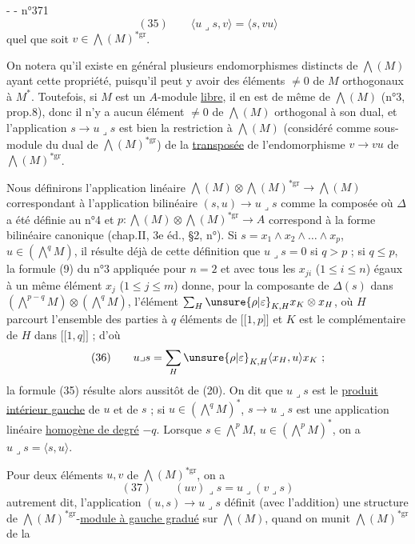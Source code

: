 -  -
\hfill n°371
\[
(35)\qquad\langle u\lrcorner s,v\rangle=\langle s,vu\rangle
\]
quel que soit $v\in\bigwedge(M)^{*\mathrm{gr}}$.

On notera qu'il existe en général plusieurs endomorphismes distincts de $\bigwedge(M)$ ayant cette propriété, puisqu'il peut y avoir des éléments $\ne0$ de $M$ orthogonaux à $M^*$. Toutefois, si $M$ est un $A$-module \uline{libre}, il en est de même de $\bigwedge(M)$ (n°3, prop.8), donc il n'y a aucun élément $\ne0$ de $\bigwedge(M)$ orthogonal à son dual, et l'application $s\longrightarrow u\lrcorner s$ est bien la restriction à $\bigwedge(M)$ (considéré comme sous-module du dual de $\bigwedge(M)^{*\mathrm{gr}}$) de la \uline{transposée} de l'endomorphisme $v\longrightarrow vu$ de $\bigwedge(M)^{*\mathrm{gr}}$.

Nous définirons l'application linéaire $\bigwedge(M)\otimes\bigwedge(M)^{*\mathrm{gr}}\longrightarrow\bigwedge(M)$ correspondant à l'application bilinéaire $(s,u)\longrightarrow u\lrcorner s$ comme la composée
où $\Delta$ a été définie au n°4 et $p:\bigwedge(M)\otimes\bigwedge(M)^{*\mathrm{gr}}\longrightarrow A$ correspond à la forme bilinéaire canonique (chap.II, 3e éd., §2, n°\quad). Si $s=x_1\wedge x_2\wedge\ldots\wedge x_p$, $u\in(\bigwedge^qM)$, il résulte déjà de cette définition que $u\lrcorner s=0$ si $q>p$ ; si $q\leq p$, la formule (9) du n°3 appliquée pour $n=2$ et avec tous les $x_{ji}$ ($1\leq i\leq n$) égaux à un même élément $x_j$ ($1\leq j\leq m$) donne, pour la composante de $\Delta(s)$ dans $(\bigwedge^{p-q}M)\otimes(\bigwedge^qM)$, l'élément $\sum_H\unsure{\rho|\varepsilon}_{K,H}x_K\otimes x_H$, où $H$ parcourt l'ensemble des parties à $q$ éléments de $\lbrack\!\lbrack1,p\rbrack\!\rbrack$ et $K$ est le complémentaire de $H$ dans $\lbrack\!\lbrack1,q\rbrack\!\rbrack$ ; d'où
\[
(36)\qquad u\lrcorner s=\sum_H\unsure{\rho|\varepsilon}_{K,H}\langle x_H,u\rangle x_K\ ;
\]
la formule (35) résulte alors aussitôt de (20). On dit que $u\lrcorner s$ est le \uline{produit intérieur gauche} de $u$ et de $s$ ; si $u\in(\bigwedge^qM)^*$, $s\longrightarrow u\lrcorner s$ est une application linéaire \uline{homogène de degré} $-q$. Lorsque $s\in\bigwedge^pM$, $u\in(\bigwedge^pM)^*$, on a $u\lrcorner s=\langle s,u\rangle$.

Pour deux éléments $u,v$ de $\bigwedge(M)^{*\mathrm{gr}}$, on a
\[
(37)\qquad(uv)\lrcorner s=u\lrcorner(v\lrcorner s)
\]
autrement dit, l'application $(u,s)\longrightarrow u\lrcorner s$ définit (avec l'addition) une structure de $\bigwedge(M)^{*\mathrm{gr}}$-\uline{module à gauche gradué} sur $\bigwedge(M)$, quand on munit $\bigwedge(M)^{*\mathrm{gr}}$ de la
